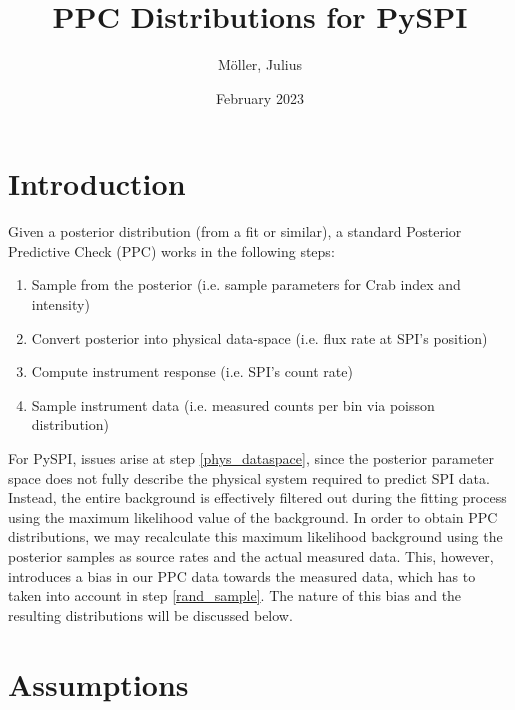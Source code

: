 \documentclass{article}
\title{PPC Distributions for  PySPI}
\author{Möller, Julius}
\date{February 2023}
\begin{document}
\maketitle

\section{Introduction}

Given a posterior distribution (from a fit or similar), a standard Posterior Predictive Check (PPC) works in the
following steps:
\begin{enumerate}
    \item Sample from the posterior (i.e. sample parameters for Crab index and intensity)
    \item \label{phys_dataspace} Convert posterior into physical data-space (i.e. flux rate at SPI's position)
    \item Compute instrument response (i.e. SPI's count rate)
    \item \label{rand_sample} Sample instrument data (i.e. measured counts per bin via poisson distribution)
\end{enumerate}
For PySPI, issues arise at step \ref{phys_dataspace}, since the posterior parameter space does not fully describe the
physical system required to predict SPI data. Instead, the entire background is effectively filtered out during the
fitting process using the maximum likelihood value of the background. In order to obtain PPC distributions, we may
recalculate this maximum likelihood background using the posterior samples as source rates and the actual measured
data. This, however, introduces a bias  in our PPC data towards the measured data, which has to taken into account in
step \ref{rand_sample}. The nature of this bias and the resulting distributions will be discussed below.

\section{Assumptions}
\end{document}
